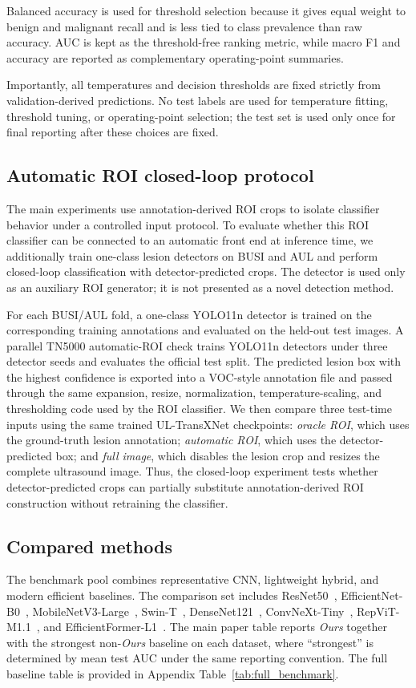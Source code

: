 Balanced accuracy is used for threshold selection because it gives equal weight to benign and malignant recall and is less tied to class prevalence than raw accuracy. AUC is kept as the threshold-free ranking metric, while macro F1 and accuracy are reported as complementary operating-point summaries.

Importantly, all temperatures and decision thresholds are fixed strictly from validation-derived predictions. No test labels are used for temperature fitting, threshold tuning, or operating-point selection; the test set is used only once for final reporting after these choices are fixed.

\subsection{Automatic ROI closed-loop protocol}
The main experiments use annotation-derived ROI crops to isolate classifier behavior under a controlled input protocol. To evaluate whether this ROI classifier can be connected to an automatic front end at inference time, we additionally train one-class lesion detectors on BUSI and AUL and perform closed-loop classification with detector-predicted crops. The detector is used only as an auxiliary ROI generator; it is not presented as a novel detection method.

For each BUSI/AUL fold, a one-class YOLO11n detector is trained on the corresponding training annotations and evaluated on the held-out test images. A parallel TN5000 automatic-ROI check trains YOLO11n detectors under three detector seeds and evaluates the official test split. The predicted lesion box with the highest confidence is exported into a VOC-style annotation file and passed through the same expansion, resize, normalization, temperature-scaling, and thresholding code used by the ROI classifier. We then compare three test-time inputs using the same trained UL-TransXNet checkpoints: \textit{oracle ROI}, which uses the ground-truth lesion annotation; \textit{automatic ROI}, which uses the detector-predicted box; and \textit{full image}, which disables the lesion crop and resizes the complete ultrasound image. Thus, the closed-loop experiment tests whether detector-predicted crops can partially substitute annotation-derived ROI construction without retraining the classifier.

\subsection{Compared methods}
The benchmark pool combines representative CNN, lightweight hybrid, and modern efficient baselines. The comparison set includes ResNet50~\cite{he2016resnet}, EfficientNet-B0~\cite{tan2019efficientnet}, MobileNetV3-Large~\cite{howard2019mobilenetv3}, Swin-T~\cite{liu2021swin}, DenseNet121~\cite{huang2017densenet}, ConvNeXt-Tiny~\cite{liu2022convnext}, RepViT-M1.1~\cite{repvit}, and EfficientFormer-L1~\cite{li2022efficientformer}. The main paper table reports \textit{Ours} together with the strongest non-\textit{Ours} baseline on each dataset, where ``strongest'' is determined by mean test AUC under the same reporting convention. The full baseline table is provided in Appendix Table~\ref{tab:full_benchmark}.

